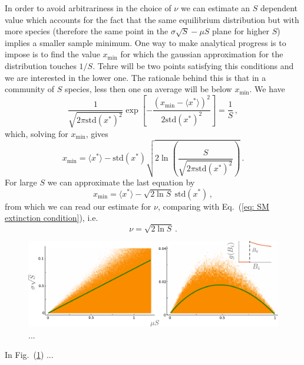 \documentclass[10pt]{article}
\begin{document}
In order to avoid arbitrariness in the choice of $\nu$
we can estimate an $S$ dependent value which accounts for the fact
that the same equilibrium distribution but with more species
(therefore the same point in the $\sigma\sqrt{S} - \mu S$ plane for higher $S$)
implies a smaller sample minimum.
One way to make analytical progress is to impose is to find the value
$x_{\textrm{min}}$ for which the gaussian approximation for the distribution touches
$1/S$. Tehre will be two points satisfying this conditions and we are interested
in the lower one. The rationale behind this is that in a community
of $S$ species, less then one on average will be below $x_{\textrm{min}}$.
We have 
\begin{equation}
    \frac{1}{\sqrt{2\pi\textrm{std}(x^*)^2}}
    \exp{\left[-\frac{(x_{\textrm{min}}-\langle x^* \rangle)^2}{2\textrm{std}(x^*)^2}\right]} = \frac{1}{S} \, ,
\end{equation}
which, solving for $x_{\textrm{min}}$, gives
\begin{equation}
    x_{\textrm{min}} = \langle x^* \rangle - \textrm{std}(x^*)\sqrt{2\ln\left(\frac{S}{\sqrt{2\pi\textrm{std}(x^*)^2}}\right)} \, .
\end{equation}
For large $S$ we can approximate the last equation by
\begin{equation}
    x_{\textrm{min}} = \langle x^* \rangle - \sqrt{2\ln S} \ \textrm{std}(x^*) \, ,
\end{equation}
from which we can read our estimate for $\nu$, comparing with Eq.~(\ref{eq: SM extinction condition}),
i.e.
\begin{equation}
    \nu = \sqrt{2\ln S}\, .
\end{equation}

\begin{figure}[h!]
    \centering
    \includegraphics[width=1\textwidth]{fig/SM-extinction.pdf}
    \caption{...}
    \label{fig: SM extinction threshold}
\end{figure}

In Fig.~(\ref{fig: SM extinction threshold}) ... 
\end{document}
